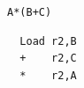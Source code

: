 \documentclass{jarticle}
\begin{document}
\verb|A*(B+C)|
\begin{Verbatim}
  Load r2,B
  +    r2,C
  *    r2,A
\end{Verbatim}
\end{document}
